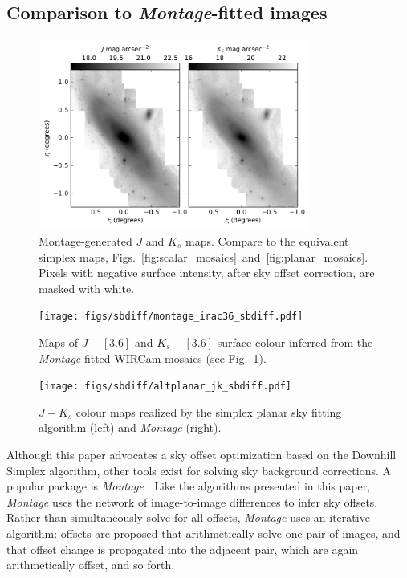 \documentclass[iop]{emulateapj}
\newcommand{\sw}[1]{\textit{#1}} %
\newcommand{\Fig}[1]{Fig.~\ref{fig:#1}}  %
\begin{document}
\subsection{Comparison to \sw{Montage}-fitted images}

\begin{figure}[t]
    \centering
        \includegraphics[width=3.5in]{figs/montage_planar_mosaics.pdf}
    \caption{Montage-generated $J$ and $K_s$ maps. Compare to the equivalent simplex maps, Figs.~\ref{fig:scalar_mosaics}~and~\ref{fig:planar_mosaics}. Pixels with negative surface intensity, after sky offset correction, are masked with white.}
    \label{fig:montage_planar_mosaics}
\end{figure}

\begin{figure}[t]
    \centering
        \texttt{[image: figs/sbdiff/montage\_irac36\_sbdiff.pdf]}
    \caption{Maps of $J-[3.6]$ and $K_s-[3.6]$ surface colour inferred from the \sw{Montage}-fitted WIRCam mosaics (see \Fig{montage_planar_mosaics}).}
    \label{fig:montage_irac36_sbdiff}
\end{figure}

\begin{figure}[t]
    \centering
        \texttt{[image: figs/sbdiff/altplanar\_jk\_sbdiff.pdf]}
    \caption{$J-K_s$ colour maps realized by the simplex planar sky fitting algorithm (left) and \sw{Montage} (right).}
    \label{fig:altplanar_jk_sbdiff}
\end{figure}


Although this paper advocates a sky offset optimization based on the \cite{Nelder:1965} Downhill Simplex algorithm, other tools exist for solving sky background corrections.
A popular package is \sw{Montage} \citep{Berriman:2008}.
Like the algorithms presented in this paper, \sw{Montage} uses the network of image-to-image differences to infer sky offsets.
Rather than simultaneously solve for all offsets, \sw{Montage} uses an iterative algorithm: offsets are proposed that arithmetically solve one pair of images, and that offset change is propagated into the adjacent pair, which are again arithmetically offset, and so forth.
\end{document}
